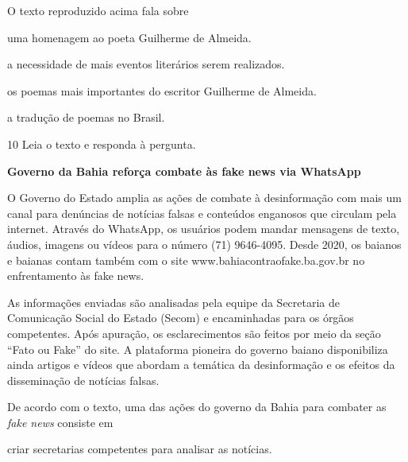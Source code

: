 \begin{myquote}
\begin{myescolha}
O texto reproduzido acima fala sobre

\begin{escolha}
  \item uma homenagem ao poeta Guilherme de Almeida.

  \item a necessidade de mais eventos literários serem realizados.

  \item os poemas mais importantes do escritor Guilherme de Almeida.

  \item a tradução de poemas no Brasil.
\end{escolha}


\num{10} Leia o texto e responda à pergunta.

\begin{myquote}
\textbf{Governo da Bahia reforça combate às fake news via WhatsApp}

O Governo do Estado amplia as ações de combate à desinformação com mais
um canal para denúncias de notícias falsas e conteúdos enganosos que
circulam pela internet. Através do WhatsApp, os usuários podem mandar
mensagens de texto, áudios, imagens ou vídeos para o número (71)
9646-4095. Desde 2020, os baianos e baianas contam também com o site
www.bahiacontraofake.ba.gov.br no enfrentamento às fake news.

As informações enviadas são analisadas pela equipe da Secretaria de
Comunicação Social do Estado (Secom) e encaminhadas para os órgãos
competentes. Após apuração, os esclarecimentos são feitos por meio da
seção ``Fato ou Fake'' do site. A plataforma pioneira do governo baiano
disponibiliza ainda artigos e vídeos que abordam a temática da
desinformação e os efeitos da disseminação de notícias falsas.

\end{myquote}

De acordo com o texto, uma das ações do governo da Bahia para combater
as \textit{fake news} consiste em

\begin{escolha}

  \item criar secretarias competentes para analisar as notícias.


\end{escolha}
\end{myescolha}
\end{myquote}
